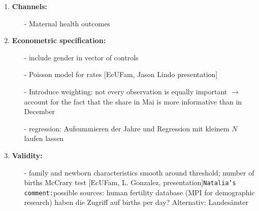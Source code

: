 \documentclass[11pt,a4paper]{article}
\begin{document}
{\begin{enumerate}
\item \textbf{Channels:}\vspace{-1em}
\begin{itemize}
	\item[-] Maternal health outcomes
\end{itemize}


\item \textbf{Econometric specification:}\vspace{-1em}
\begin{itemize}
	\item[-] include gender in vector of controls
	\item[-] Poisson model for rates [EcUFam, Jason Lindo presentation]
	\item[-] Introduce weighting: not every observation is equally important $\rightarrow$ account for the fact that the share in Mai is more informative than in December
	\item[-] regression: Aufsummieren der Jahre und Regression mit kleinem $N$ laufen lassen
\end{itemize}


\item \textbf{Validity:}\vspace{-1em}
\begin{itemize}
	\item[-] family and newborn characteristics smooth around threshold; number of births McCrary test [EcUFam, L. Gonzalez, presentation]\newline \texttt{Natalia's comment:}possible sources: human fertility database (MPI for demographic research) haben die Zugriff auf births per day? Alternativ: Landesämter
\end{itemize}



\end{enumerate}}
\end{document}
